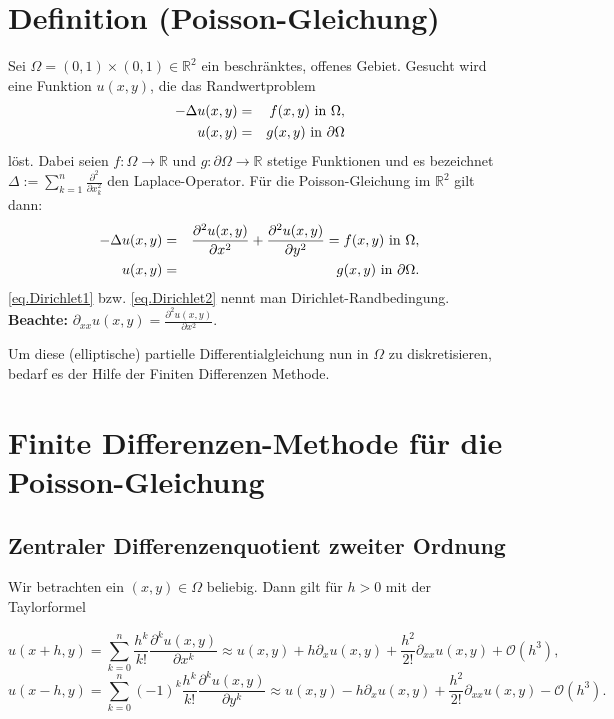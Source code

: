 \section{Definition (Poisson-Gleichung)}\label{s.Poisson-Gleichung}

Sei $\Omega = (0,1)\times(0,1) \in \mathbb{R}^{2}$ ein beschränktes, offenes Gebiet. Gesucht wird eine Funktion $u(x,y)$, die das Randwertproblem
\begin{eqnarray}
-\Delta u(x,y) &=& f(x,y) \textnormal{ in } \Omega, \\
u(x,y) &=& g(x,y) \textnormal{ in } \partial \Omega\label{eq.Dirichlet1}
\end{eqnarray}
löst.
Dabei seien $f: \Omega \rightarrow \mathbb{R}$ und $g: \partial\Omega \rightarrow \mathbb{R}$ stetige Funktionen und es bezeichnet $\Delta := \sum\limits_{k=1}^{n} \frac {\partial^{2}} {\partial x_{k}^{2}}$ den Laplace-Operator. Für die Poisson-Gleichung im $\mathbb{R}^{2}$ gilt dann:
\begin{eqnarray}
-\Delta u(x,y) &=& \frac {\partial^{2} u(x,y)} {\partial x^{2}} + \frac {\partial^{2} u(x,y)} {\partial y^{2}} = f(x,y) \textnormal{ in } \Omega, \\
u(x,y) &=& g(x,y) \textnormal{ in } \partial \Omega.\label{eq.Dirichlet2}
\end{eqnarray}
\autoref{eq.Dirichlet1} bzw. \autoref{eq.Dirichlet2} nennt man Dirichlet-Randbedingung.\\

\textbf{Beachte:} $\partial_{xx}u(x,y) = \frac {\partial^{2}u(x,y)} {\partial x^{2}}$.

Um diese (elliptische) partielle Differentialgleichung nun in $\Omega$ zu diskretisieren, bedarf es der Hilfe der Finiten Differenzen Methode.

\section{Finite Differenzen-Methode für die Poisson-Gleichung}\label{s.Finite Differenzen}

\subsection{Zentraler Differenzenquotient zweiter Ordnung}\label{ss.Differenzenquotient zweiter Ordnung}

Wir betrachten ein $(x,y) \in \Omega$ beliebig. Dann gilt für $h > 0$ mit der Taylorformel

\begin{equation}
u(x+h,y) = \sum_{k = 0}^{n} \frac {h^{k}} {k!} \frac {\partial^{k}u(x,y)} {\partial x^{k}} \approx u(x,y) + h \partial_{x} u(x,y) + \frac {h^{2}} {2!} \partial_{xx} u(x,y) + \mathcal{O}(h^{3}),\label{eq.Partiall x+h}
\end{equation}
\begin{equation}
u(x-h,y) = \sum_{k = 0}^{n} (-1)^{k} \frac {h^{k}} {k!} \frac {\partial^{k}u(x,y)} {\partial y^{k}} \approx u(x,y) - h \partial_{x} u(x,y) + \frac {h^{2}} {2!} \partial_{xx} u(x,y) - \mathcal{O}(h^{3}).\label{eq.Partiall x-h}
\end{equation}

